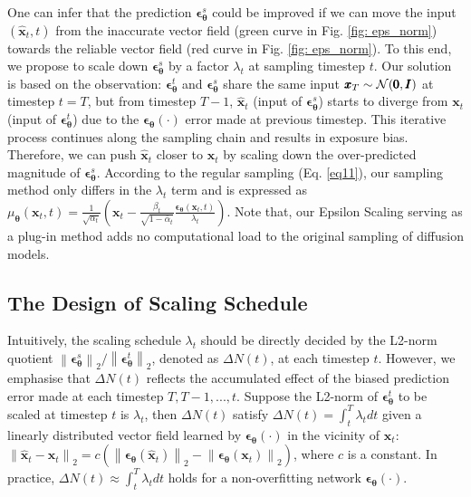 \documentclass{article} \usepackage{iclr2024_conference,times}
\begin{document}
One can infer that the prediction $\pmb{\epsilon}^{s}_{\pmb{\theta}}$ could be improved if we can move the input $(\hat{\pmb{x}}_t, t)$ from the inaccurate vector field (green curve in Fig. \ref{fig: eps_norm}) towards the reliable vector field (red curve in Fig. \ref{fig: eps_norm}). To this end, we propose to scale down $\pmb{\epsilon}^{s}_{\pmb{\theta}}$ by a factor $\lambda_t$ at sampling timestep $t$. Our solution is based on the observation: $\pmb{\epsilon}^{t}_{\pmb{\theta}}$ and $\pmb{\epsilon}^{s}_{\pmb{\theta}}$ share the same input $\pmb{x}_T \sim {\cal N} (\pmb{0}, \pmb{I})$ at timestep $t=T$, but from timestep $T-1$, $\hat{\pmb{x}}_t$ (input of $\pmb{\epsilon}^{s}_{\pmb{\theta}}$) starts to diverge from $\pmb{x}_t$ (input of $\pmb{\epsilon}^{t}_{\pmb{\theta}}$) due to the $\pmb{\epsilon_{\theta}}(\cdot)$ error made at previous timestep. This iterative process continues along the sampling chain and results in exposure bias. Therefore, we can push $\hat{\pmb{x}}_t$ closer to $\pmb{x}_t$ by scaling down the over-predicted magnitude of $\pmb{\epsilon}^{s}_{\pmb{\theta}}$. According to the regular sampling (Eq. \ref{eq11}), our sampling method only differs in the $\lambda_t$ term and is expressed as $\mu_{\pmb{\theta}}(\pmb{x}_t, t) = \frac{1}{\sqrt{\alpha_t}}(\pmb{x}_t - \frac{\beta_t}{\sqrt{1-\bar{\alpha}_t}} \frac{\pmb{\epsilon_{\theta}}(\pmb{x}_t, t)}{\lambda_t} )$. Note that, our Epsilon Scaling serving as a plug-in method adds no computational load to the original sampling of diffusion models.



\subsection{The Design of Scaling Schedule}
Intuitively, the scaling schedule $\lambda_t$ should be directly decided by the L2-norm quotient $\left\| \pmb{\epsilon}^{s}_{\pmb{\theta}} \right\|_2 / \left\| \pmb{\epsilon}^{t}_{\pmb{\theta}} \right\|_2$, denoted as $\Delta N (t)$, at each timestep $t$. However, we emphasise that $\Delta N (t)$ reflects the accumulated effect of the biased prediction error made at each timestep $T, T-1,..., t$. Suppose the L2-norm of $\pmb{\epsilon}^{t}_{\pmb{\theta}}$ to be scaled at timestep $t$ is $\lambda_t$, then $\Delta N (t)$ satisfy $\Delta N (t) = \int_{t}^{T} \lambda_t dt$ given a linearly distributed vector field learned by $\pmb{\epsilon_{\theta}}(\cdot)$ in the vicinity of $\pmb{x}_{t}$: $\left\| \hat{\pmb{x}}_t - \pmb{x}_{t} \right\|_2 = c (\left\| \pmb{\epsilon_{\theta}}(\hat{\pmb{x}}_t) \right\|_2 - \left\| \pmb{\epsilon_{\theta}}(\pmb{x}_{t}) \right\|_2)$, where $c$ is a constant. In practice, $\Delta N (t) \approx \int_{t}^{T} \lambda_t dt$ holds for a non-overfitting network $\pmb{\epsilon_{\theta}}(\cdot)$. 
\end{document}
